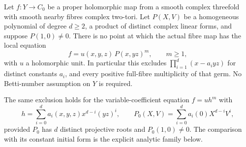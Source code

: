 
\begin{proposition}\label{cdp:st:A.5.21}
Let $f:Y\to C_0$ be a proper holomorphic map from a smooth
complex threefold with smooth nearby fibres complex
two-tori. Let $P(X,V)$ be a homogeneous polynomial of
degree $d\ge2$, a product of distinct complex linear
forms, and suppose $P(1,0)\ne0$.
There is no point at which the actual fibre map has
the local equation
\[
             f=u(x,y,z)\,P(x,yz)^m,
             \qquad m\ge1,                         \tag{A.BP.1}\label{cdp:eq:A.BP.1}
\]
with $u$ a holomorphic unit. In particular this excludes
$\prod_{i=1}^d(x-a_i yz)$ for distinct constants $a_i$,
and every positive full-fibre multiplicity of that germ.
No Betti-number assumption on $Y$ is required.

The same exclusion holds for the variable-coefficient
equation $f=u h^m$ with
\[
 h=\sum_{i=0}^d a_i(x,y,z)x^{d-i}(yz)^i,
 \qquad P_0(X,V)=\sum_{i=0}^d a_i(0)X^{d-i}V^i,
                                                        \tag{A.BP.4}\label{cdp:eq:A.BP.4}
\]
provided $P_0$ has $d$ distinct projective roots and
$P_0(1,0)\ne0$. The comparison with its constant
initial form is the explicit analytic family below.
\end{proposition}

